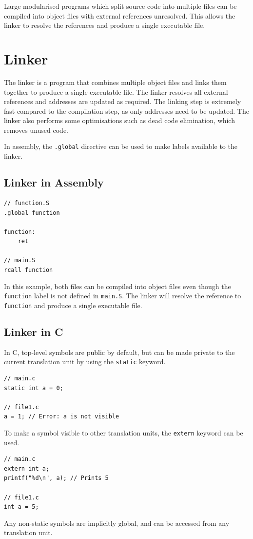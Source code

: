 \documentclass{report}
\begin{document}
Large modularised programs which split source code
into multiple files can be compiled into object files
with external references unresolved. This allows the linker to
resolve the references and produce a single executable file.
\section{Linker}
The linker is a program that combines multiple object files and links them
together to produce a single executable file. The linker resolves all
external references and addresses are updated as required. The linking step is
extremely fast compared to the compilation step, as only addresses
need to be updated. The linker also performs some optimisations such as
dead code elimination, which removes unused code.

In assembly, the \texttt{.global} directive can be used to
make labels available to the linker.
\subsection{Linker in Assembly}
\begin{verbatim}
// function.S
.global function

function:
    ret

// main.S
rcall function
\end{verbatim}
In this example, both files can be compiled into object files even though
the \texttt{function} label is not defined in \texttt{main.S}.
The linker will resolve the reference to \texttt{function} and
produce a single executable file.
\subsection{Linker in C}
In C, top-level symbols are public by default, but can be made private
to the current translation unit by using the \texttt{static} keyword.
\begin{verbatim}
// main.c
static int a = 0;

// file1.c
a = 1; // Error: a is not visible
\end{verbatim}
To make a symbol visible to other translation units, the \texttt{extern} keyword
can be used.
\begin{verbatim}
// main.c
extern int a;
printf("%d\n", a); // Prints 5

// file1.c
int a = 5;
\end{verbatim}
Any non-static symbols are implicitly global, and can be accessed from any translation unit.
\end{document}
